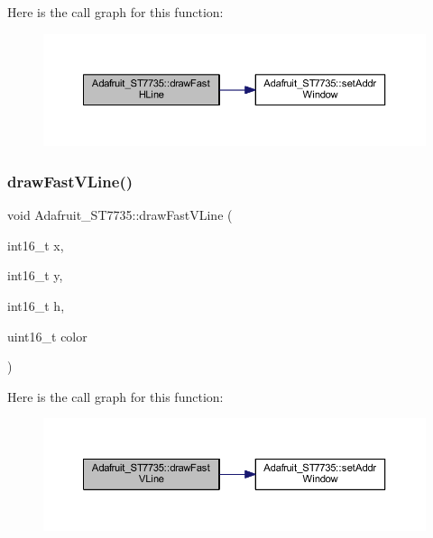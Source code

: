 Here is the call graph for this function\+:
\nopagebreak
\begin{figure}[H]
\begin{center}
\leavevmode
\includegraphics[width=350pt]{dd/dee/class_adafruit___s_t7735_ab2b8eb320bd19305c09b35be6d55d37e_cgraph}
\end{center}
\end{figure}
\mbox{\label{class_adafruit___s_t7735_a38de2e08911db493eb243ce2691e9c3a}} 
\subsubsection{\texorpdfstring{draw\+Fast\+V\+Line()}{drawFastVLine()}}
{\footnotesize\ttfamily void Adafruit\+\_\+\+S\+T7735\+::draw\+Fast\+V\+Line (\begin{DoxyParamCaption}\item[{int16\+\_\+t}]{x,  }\item[{int16\+\_\+t}]{y,  }\item[{int16\+\_\+t}]{h,  }\item[{uint16\+\_\+t}]{color }\end{DoxyParamCaption})}

Here is the call graph for this function\+:
\nopagebreak
\begin{figure}[H]
\begin{center}
\leavevmode
\includegraphics[width=350pt]{dd/dee/class_adafruit___s_t7735_a38de2e08911db493eb243ce2691e9c3a_cgraph}
\end{center}
\end{figure}
\mbox{\label{class_adafruit___s_t7735_af22a5ba7282850793f4943ba2d682af0}} 
